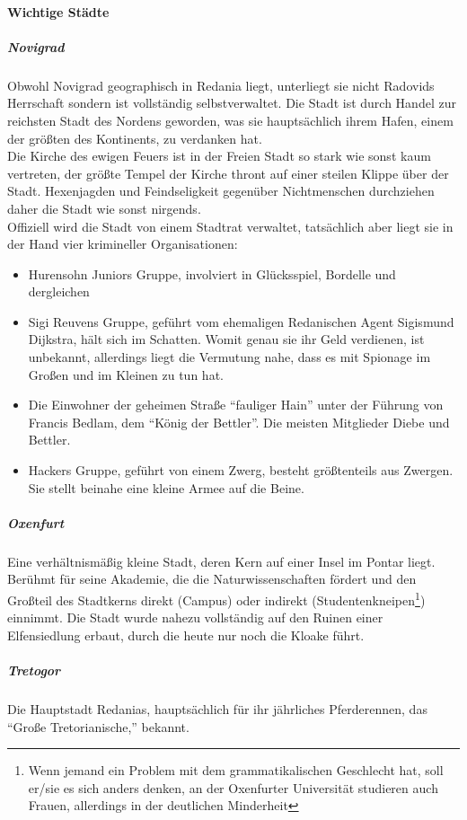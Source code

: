 \documentclass[parskip=full,11pt,%
footheight=38pt]{scrreport}
\begin{document}
	\paragraph{Wichtige Städte}
	\subparagraph{Novigrad}
	Obwohl Novigrad geographisch in Redania liegt, unterliegt sie nicht Radovids Herrschaft sondern ist vollständig selbstverwaltet. Die Stadt ist durch Handel zur reichsten Stadt des Nordens geworden, was sie hauptsächlich ihrem Hafen, einem der größten des Kontinents, zu verdanken hat.\\
	Die Kirche des ewigen Feuers ist in der Freien Stadt so stark wie sonst kaum vertreten, der größte Tempel der Kirche thront auf einer steilen Klippe über der Stadt. Hexenjagden und Feindseligkeit gegenüber Nichtmenschen durchziehen daher die Stadt wie sonst nirgends.\\
	Offiziell wird die Stadt von einem Stadtrat verwaltet, tatsächlich aber liegt sie in der Hand vier krimineller Organisationen:
	\begin{itemize}
		\item Hurensohn Juniors Gruppe, involviert in Glücksspiel, Bordelle und dergleichen
		\item Sigi Reuvens Gruppe, geführt vom ehemaligen Redanischen Agent Sigismund Dijkstra, hält sich im Schatten. Womit genau sie ihr Geld verdienen, ist unbekannt, allerdings liegt die Vermutung nahe, dass es mit Spionage im Großen und im Kleinen zu tun hat.
		\item Die Einwohner der geheimen Straße ``fauliger Hain'' unter der Führung von Francis Bedlam, dem ``König der Bettler''. Die meisten Mitglieder Diebe und Bettler.
		\item Hackers Gruppe, geführt von einem Zwerg, besteht größtenteils aus Zwergen. Sie stellt beinahe eine kleine Armee auf die Beine.
	\end{itemize}
	\subparagraph{Oxenfurt}
	Eine verhältnismäßig kleine Stadt, deren Kern auf einer Insel im Pontar liegt. Berühmt für seine Akademie, die die Naturwissenschaften fördert und den Großteil des Stadtkerns direkt (Campus) oder indirekt (Studentenkneipen\footnote{Wenn jemand ein Problem mit dem grammatikalischen Geschlecht hat, soll er/sie es sich anders denken, an der Oxenfurter Universität studieren auch Frauen, allerdings in der deutlichen Minderheit}) einnimmt. Die Stadt wurde nahezu vollständig auf den Ruinen einer Elfensiedlung erbaut, durch die heute nur noch die Kloake führt.
	\subparagraph{Tretogor}
	Die Hauptstadt Redanias, hauptsächlich für ihr jährliches Pferderennen, das ``Große Tretorianische,'' bekannt.
\end{document}
